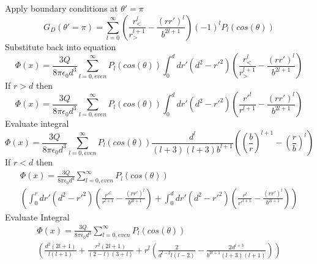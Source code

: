 \documentclass[12pt]{article}
\begin{document}
    Apply boundary conditions at $\theta'=\pi$
    \begin{equation} \label{eq: 3.14-9}
        G_D(\theta'=\pi) = \sum_{l=0}^\infty \left(\frac{r_<^l}{r_>^{l+1}} - \frac{(rr')^l}{b^{2l+1}} \right) (-1)^l P_l(cos(\theta))
    \end{equation}
    Substitute back into equation
    \begin{equation} \label{eq: 3.14-10}
        \Phi(x) = \frac{3 Q}{8 \pi \epsilon_0 d^3} \sum_{l=0, even}^\infty P_l(cos(\theta)) \int_0^d dr'(d^2-{r'}^2) \left(\frac{r_<^l}{r_>^{l+1}} - \frac{(rr')^l}{b^{2l+1}} \right) 
    \end{equation}
    If $r>d$ then
    \begin{equation} \label{eq: 3.14-11}
        \Phi(x) = \frac{3 Q}{8 \pi \epsilon_0 d^3} \sum_{l=0, even}^\infty P_l(cos(\theta)) \int_0^d dr'(d^2-{r'}^2) \left(\frac{{r'}^l}{r^{l+1}} - \frac{(rr')^l}{b^{2l+1}} \right) 
    \end{equation}
    Evaluate integral
    \begin{equation} \label{eq: 3.14-12}
        \Phi(x) = \frac{3 Q}{8 \pi \epsilon_0 d^3} \sum_{l=0, even}^\infty P_l(cos(\theta)) \frac{d^l}{(l+3)(l+3)b^{l+1}} \left(\left(\frac{b}{r} \right)^{l+1} - \left( \frac{r}{b} \right)^l \right) 
    \end{equation}
    If $r<d$ then
    \begin{equation} \label{eq: 3.14-13}
        \begin{split}
        \Phi(x) = \frac{3 Q}{8 \pi \epsilon_0 d^3} \sum_{l=0, even}^\infty P_l(cos(\theta)) 
        \\\left( \int_0^r dr'(d^2-{r'}^2) \left(\frac{{r'}^l}{r^{l+1}} - \frac{(rr')^l}{b^{2l+1}} \right) + \int_0^d dr'(d^2-{r'}^2) \left(\frac{{r}^l}{{r'}^{l+1}} - \frac{(rr')^l}{b^{2l+1}} \right) \right)
        \end{split}        
    \end{equation}
    Evaluate Integral
    \begin{equation} \label{eq: 3.14-14}
        \begin{split}
        \Phi(x) = \frac{3 Q}{8 \pi \epsilon_0 d^3} \sum_{l=0, even}^\infty P_l(cos(\theta)) 
        \\ \left(\frac{d^2 (2l+1)}{l(l+1)} + \frac{r^2 (2l+1)}{(2-l)(3+l)} + r^l \left(\frac{2}{d^{l-2} l (l-2)} - \frac{2 d^{l+3}}{b^{2l+1} (l+3) (l+1)} \right) \right)
        \end{split}
    \end{equation}
    
\end{document}
